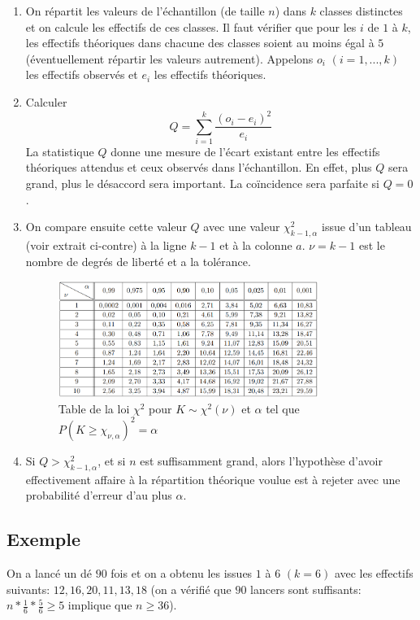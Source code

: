 \documentclass[12pt,a4paper]{article}
\begin{document}
\begin{enumerate}
\item On répartit les valeurs de l'échantillon (de taille $n$) dans $k$ classes distinctes et on calcule les effectifs de ces classes. Il faut vérifier que pour les $i$ de $1$ à $k$, les effectifs théoriques dans chacune des classes soient au moins égal à $5$ (éventuellement répartir les valeurs autrement). Appelons $o_i$ $(i=1,...,k)$ les effectifs observés et $e_i$ les effectifs théoriques.
\item Calculer \[Q = \sum\limits_{i = 1}^k {\frac{{{{\left( {{o_i} - {e_i}} \right)}^2}}}{{{e_i}}}} \]
La statistique $Q$ donne une mesure de l'écart existant entre les effectifs théoriques attendus et ceux observés dans l'échantillon. En effet, plus $Q$ sera grand, plus le désaccord sera important. La coïncidence sera parfaite si $Q=0$.
\item On compare ensuite cette valeur $Q$ avec une valeur $\chi_{k-1, \alpha}^2$ issue d'un tableau (voir extrait ci-contre) à la ligne $k-1$ et à la colonne $a$. $\nu = k-1$ est le nombre de degrés de liberté et a la tolérance.
\begin{figure}[!h]
\centering
\includegraphics[width=0.8\textwidth]{images/Chi_deux.png}
\caption{Table de la loi $\chi^2$ pour $K \sim \chi^2(\nu)$ et $\alpha$ tel que $P(K \geq \chi_{\nu, \alpha})^2 = \alpha$}
\label{ChiDeux}
\end{figure}
\item Si $Q > \chi_{k-1, \alpha}^2$, et si $n$ est suffisamment grand, alors l'hypothèse d'avoir effectivement affaire à la répartition théorique voulue est à rejeter avec une probabilité d'erreur d'au plus $\alpha$.
\end{enumerate}

\subsection{Exemple}
On a lancé un dé $90$ fois et on a obtenu les issues $1$ à $6$ $(k=6)$ avec les effectifs suivants: $12, 16, 20, 11, 13, 18$ (on a vérifié que $90$ lancers sont suffisants: $n * \frac{1}{6} * \frac{5}{6} \geq 5$ implique que $n \geq 36$).
 
\end{document}

